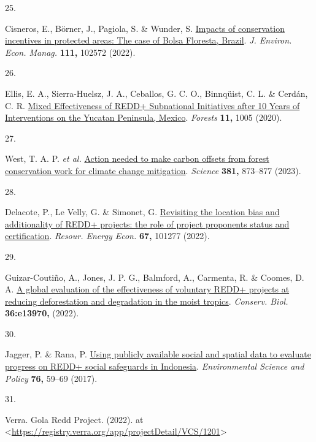 \documentclass[
]{article}
\newlength{\cslhangindent}
\newlength{\csllabelwidth}
\newlength{\cslentryspacingunit} %
\newenvironment{CSLReferences}[2] %
 {%
  \setlength{\parindent}{0pt}
  \ifodd #1
  \let\oldpar\par
  \def\par{\hangindent=\cslhangindent\oldpar}
  \fi
  \setlength{\parskip}{#2\cslentryspacingunit}
 }%
 {}
\newcommand{\CSLLeftMargin}[1]{\parbox[t]{\csllabelwidth}{#1}}
\newcommand{\CSLRightInline}[1]{\parbox[t]{\linewidth - \csllabelwidth}{#1}\break}
\begin{document}
\begin{CSLReferences}{0}{0}
\leavevmode{}%
\CSLLeftMargin{25. }%
\CSLRightInline{Cisneros, E., Börner, J., Pagiola, S. \& Wunder, S.
\href{https://doi.org/10.1016/J.JEEM.2021.102572}{{Impacts of
conservation incentives in protected areas: The case of Bolsa Floresta,
Brazil}}. \emph{J. Environ. Econ. Manag.} \textbf{111,} 102572 (2022).}

\leavevmode{}%
\CSLLeftMargin{26. }%
\CSLRightInline{Ellis, E. A., Sierra-Huelsz, J. A., Ceballos, G. C. O.,
Binnqüist, C. L. \& Cerdán, C. R.
\href{https://doi.org/10.3390/F11091005}{{Mixed Effectiveness of REDD+
Subnational Initiatives after 10 Years of Interventions on the Yucatan
Peninsula, Mexico}}. \emph{Forests} \textbf{11,} 1005 (2020).}

\leavevmode{}%
\CSLLeftMargin{27. }%
\CSLRightInline{West, T. A. P. \emph{et al.}
\href{https://doi.org/10.1126/science.ade3535}{{Action needed to make
carbon offsets from forest conservation work for climate change
mitigation}}. \emph{Science} \textbf{381,} 873--877 (2023).}

\leavevmode{}%
\CSLLeftMargin{28. }%
\CSLRightInline{Delacote, P., Le Velly, G. \& Simonet, G.
\href{https://doi.org/10.1016/J.RESENEECO.2021.101277}{{Revisiting the
location bias and additionality of REDD+ projects: the role of project
proponents status and certification}}. \emph{Resour. Energy Econ.}
\textbf{67,} 101277 (2022).}

\leavevmode{}%
\CSLLeftMargin{29. }%
\CSLRightInline{Guizar-Coutiño, A., Jones, J. P. G., Balmford, A.,
Carmenta, R. \& Coomes, D. A.
\href{https://doi.org/10.1111/cobi.13970}{{A global evaluation of the
effectiveness of voluntary REDD+ projects at reducing deforestation and
degradation in the moist tropics}}. \emph{Conserv. Biol.}
\textbf{36:e13970,} (2022).}

\leavevmode{}%
\CSLLeftMargin{30. }%
\CSLRightInline{Jagger, P. \& Rana, P.
\href{https://doi.org/10.1016/j.envsci.2017.06.006}{{Using publicly
available social and spatial data to evaluate progress on REDD+ social
safeguards in Indonesia}}. \emph{Environmental Science and Policy}
\textbf{76,} 59--69 (2017).}

\leavevmode{}%
\CSLLeftMargin{31. }%
\CSLRightInline{Verra. {Gola Redd Project}. (2022). at
\textless{}\url{https://registry.verra.org/app/projectDetail/VCS/1201}\textgreater{}}


\end{CSLReferences}
\end{document}
